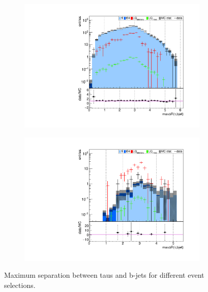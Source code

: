 \begin{figure}
\begin{subfigure}[t]{0.49\textwidth}
                \label{maxdR:taubjet:2b2tau}
                \end{subfigure}
                \begin{subfigure}[t]{0.49\textwidth}
                \includegraphics[width=\textwidth]{figures/plots/kinLQ75/maxdR_taubjet_2j1b_1tau.pdf}
                \label{maxdR:taubjet:1b1tau}
                \end{subfigure}
                \begin{subfigure}[t]{0.49\textwidth}
                \includegraphics[width=\textwidth]{figures/plots/kinLQ75/maxdR_taubjet_2j1b_2tau.pdf}
                \label{maxdR:taubjet:1b2tau}
                \end{subfigure}
\caption[Maximum separation between taus and b-jets for different event selections.]{Maximum separation between taus and b-jets for different event selections.}
\label{maxdR:taubjet}
\end{figure}
